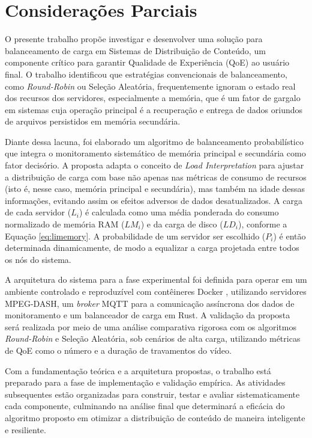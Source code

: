 \chapter{Considerações Parciais}

O presente trabalho propõe investigar e desenvolver uma solução para balanceamento de carga em Sistemas de Distribuição de Conteúdo, um componente crítico para garantir Qualidade de Experiência (QoE) ao usuário final. O trabalho identificou que estratégias convencionais de balanceamento, como \textit{Round-Robin} ou Seleção Aleatória, frequentemente ignoram o estado real dos recursos dos servidores, especialmente a memória, que é um fator de gargalo em sistemas cuja operação principal é a recuperação e entrega de dados oriundos de arquivos persistidos em memória secundária.

Diante dessa lacuna, foi elaborado um algoritmo de balanceamento probabilístico  que integra o monitoramento sistemático de memória principal e secundária como fator decisório. A proposta adapta o conceito de \textit{Load Interpretation}  para ajustar a distribuição de carga com base não apenas nas métricas de consumo de recursos (isto é, nesse caso, memória principal e secundária), mas também na idade dessas informações, evitando assim os efeitos adversos de dados desatualizados. A carga de cada servidor ($L_i$) é calculada como uma média ponderada do consumo normalizado de memória RAM ($LM_i$) e da carga de disco ($LD_i$), conforme a Equação \ref{eq:limemory}. A probabilidade de um servidor ser escolhido ($P_i$) é então determinada dinamicamente, de modo a equalizar a carga projetada entre todos os nós do sistema.

A arquitetura do sistema para a fase experimental foi definida para operar em um ambiente controlado e reproduzível com contêineres Docker , utilizando servidores MPEG-DASH, um \textit{broker} MQTT para a comunicação assíncrona dos dados de monitoramento  e um balanceador de carga em Rust. A validação da proposta será realizada por meio de uma análise comparativa rigorosa com os algoritmos \textit{Round-Robin} e Seleção Aleatória, sob cenários de alta carga, utilizando métricas de QoE como o número e a duração de travamentos do vídeo.

Com a fundamentação teórica e a arquitetura propostas, o trabalho está preparado para a fase de implementação e validação empírica. As atividades subsequentes estão organizadas para construir, testar e avaliar sistematicamente cada componente, culminando na análise final que determinará a eficácia do algoritmo proposto em otimizar a distribuição de conteúdo de maneira inteligente e resiliente.

